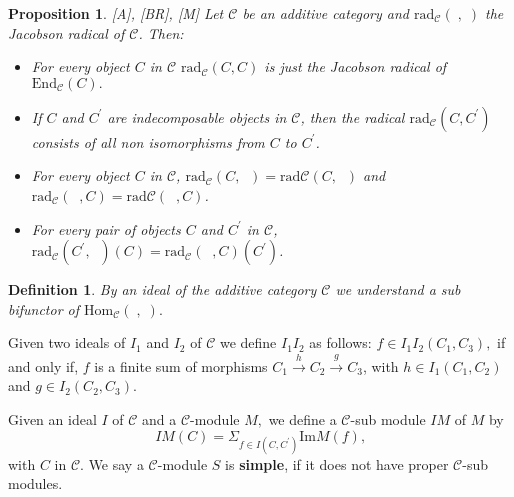 \documentclass{amsart}
\theoremstyle{plain}
\newtheorem{definition}{Definition}
\newtheorem{proposition}{Proposition}
\numberwithin{equation}{section}
\begin{document}
\begin{proposition}
\label{cap1.21}\emph{[A], [BR], [M]} Let $\mathcal{C}$ be an additive
category and $\mathrm{rad}_{\mathcal{C}}(\;,\;)$ the Jacobson radical of $\mathcal{C}$. Then:

\begin{itemize}
\item[(a)] For every object $C$ in $\mathcal{C}$ $\mathrm{rad}_{\mathcal{C}}(C,C)$ is just the Jacobson radical of $\mathrm{End}_{\mathcal{C}}(C).$

\item[(b)] If $C$ and $C^{\prime }$ are indecomposable objects in $\mathcal{C}$, then the radical $\mathrm{rad}_{\mathcal{C}}(C,C^{\prime })$ consists of
all non isomorphisms from $C$ to $C^{\prime }$.

\item[(c)] For every object $C$ in $\mathcal{C}$, $\mathrm{rad}_{\mathcal{C}}(C,\;\;)=\mathrm{rad}\mathcal{C}(C,\;\;)$ and $\mathrm{rad}_{\mathcal{C}}(\;\;,C)=\mathrm{rad}\mathcal{C}(\;\;,C)$.

\item[(d)] For every pair of objects $C$ and $C^{\prime }$ in $\mathcal{C}$,
$\mathrm{rad}_{\mathcal{C}}(C^{\prime },\;\;)(C)=\mathrm{rad}_{\mathcal{C}}(\;\;,C)(C^{\prime })$.
\end{itemize}
\end{proposition}

\begin{definition}
By an ideal of the additive category $\mathcal{C}$ we understand a sub
bifunctor of $\mathrm{Hom}_{\mathcal{C}}(\;,\;).$
\end{definition}

Given two ideals of $I_{1}$ and $I_{2}$ of $\mathcal{C}$ we define $I_{1}I_{2}$ as follows: $f\in I_{1}I_{2}(C_{1},C_{3}),$ if and only if, $f$
is a finite sum of morphisms $C_{1}\xrightarrow{h}C_{2}\xrightarrow{g}C_{3}$, with $h\in I_{1}(C_{1},C_{2})$ and $g\in I_{2}(C_{2},C_{3})$.

Given an ideal $I$ of $\mathcal{C}$ and a $\mathcal{C}$-module $M,$ we
define a $\mathcal{C}$-sub module $IM$ of $M$ by
\begin{equation*}
IM(C)=\Sigma _{f\in I(C,C^{\prime })}\mathrm{Im}M(f)\text{,}
\end{equation*}with $C$ in $\mathcal{C}$. We say a $\mathcal{C}$-module $S$ is \textbf{simple}, if it does not have proper $\mathcal{C}$-sub modules.
\end{document}
